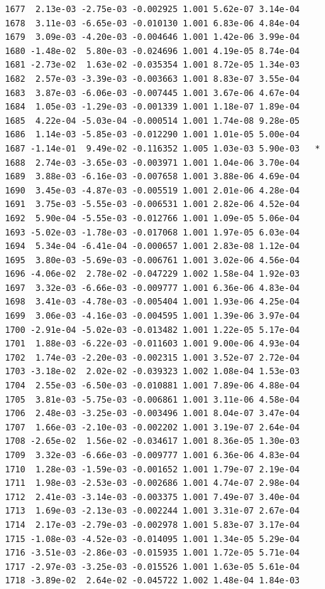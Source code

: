 \documentclass[
  letterpaper,
  DIV=11,
  numbers=noendperiod]{scrartcl}
\begin{document}
\begin{verbatim}
1677  2.13e-03 -2.75e-03 -0.002925 1.001 5.62e-07 3.14e-04    
1678  3.11e-03 -6.65e-03 -0.010130 1.001 6.83e-06 4.84e-04    
1679  3.09e-03 -4.20e-03 -0.004646 1.001 1.42e-06 3.99e-04    
1680 -1.48e-02  5.80e-03 -0.024696 1.001 4.19e-05 8.74e-04    
1681 -2.73e-02  1.63e-02 -0.035354 1.001 8.72e-05 1.34e-03    
1682  2.57e-03 -3.39e-03 -0.003663 1.001 8.83e-07 3.55e-04    
1683  3.87e-03 -6.06e-03 -0.007445 1.001 3.67e-06 4.67e-04    
1684  1.05e-03 -1.29e-03 -0.001339 1.001 1.18e-07 1.89e-04    
1685  4.22e-04 -5.03e-04 -0.000514 1.001 1.74e-08 9.28e-05    
1686  1.14e-03 -5.85e-03 -0.012290 1.001 1.01e-05 5.00e-04    
1687 -1.14e-01  9.49e-02 -0.116352 1.005 1.03e-03 5.90e-03   *
1688  2.74e-03 -3.65e-03 -0.003971 1.001 1.04e-06 3.70e-04    
1689  3.88e-03 -6.16e-03 -0.007658 1.001 3.88e-06 4.69e-04    
1690  3.45e-03 -4.87e-03 -0.005519 1.001 2.01e-06 4.28e-04    
1691  3.75e-03 -5.55e-03 -0.006531 1.001 2.82e-06 4.52e-04    
1692  5.90e-04 -5.55e-03 -0.012766 1.001 1.09e-05 5.06e-04    
1693 -5.02e-03 -1.78e-03 -0.017068 1.001 1.97e-05 6.03e-04    
1694  5.34e-04 -6.41e-04 -0.000657 1.001 2.83e-08 1.12e-04    
1695  3.80e-03 -5.69e-03 -0.006761 1.001 3.02e-06 4.56e-04    
1696 -4.06e-02  2.78e-02 -0.047229 1.002 1.58e-04 1.92e-03    
1697  3.32e-03 -6.66e-03 -0.009777 1.001 6.36e-06 4.83e-04    
1698  3.41e-03 -4.78e-03 -0.005404 1.001 1.93e-06 4.25e-04    
1699  3.06e-03 -4.16e-03 -0.004595 1.001 1.39e-06 3.97e-04    
1700 -2.91e-04 -5.02e-03 -0.013482 1.001 1.22e-05 5.17e-04    
1701  1.88e-03 -6.22e-03 -0.011603 1.001 9.00e-06 4.93e-04    
1702  1.74e-03 -2.20e-03 -0.002315 1.001 3.52e-07 2.72e-04    
1703 -3.18e-02  2.02e-02 -0.039323 1.002 1.08e-04 1.53e-03    
1704  2.55e-03 -6.50e-03 -0.010881 1.001 7.89e-06 4.88e-04    
1705  3.81e-03 -5.75e-03 -0.006861 1.001 3.11e-06 4.58e-04    
1706  2.48e-03 -3.25e-03 -0.003496 1.001 8.04e-07 3.47e-04    
1707  1.66e-03 -2.10e-03 -0.002202 1.001 3.19e-07 2.64e-04    
1708 -2.65e-02  1.56e-02 -0.034617 1.001 8.36e-05 1.30e-03    
1709  3.32e-03 -6.66e-03 -0.009777 1.001 6.36e-06 4.83e-04    
1710  1.28e-03 -1.59e-03 -0.001652 1.001 1.79e-07 2.19e-04    
1711  1.98e-03 -2.53e-03 -0.002686 1.001 4.74e-07 2.98e-04    
1712  2.41e-03 -3.14e-03 -0.003375 1.001 7.49e-07 3.40e-04    
1713  1.69e-03 -2.13e-03 -0.002244 1.001 3.31e-07 2.67e-04    
1714  2.17e-03 -2.79e-03 -0.002978 1.001 5.83e-07 3.17e-04    
1715 -1.08e-03 -4.52e-03 -0.014095 1.001 1.34e-05 5.29e-04    
1716 -3.51e-03 -2.86e-03 -0.015935 1.001 1.72e-05 5.71e-04    
1717 -2.97e-03 -3.25e-03 -0.015526 1.001 1.63e-05 5.61e-04    
1718 -3.89e-02  2.64e-02 -0.045722 1.002 1.48e-04 1.84e-03    

\end{verbatim}
\end{document}
